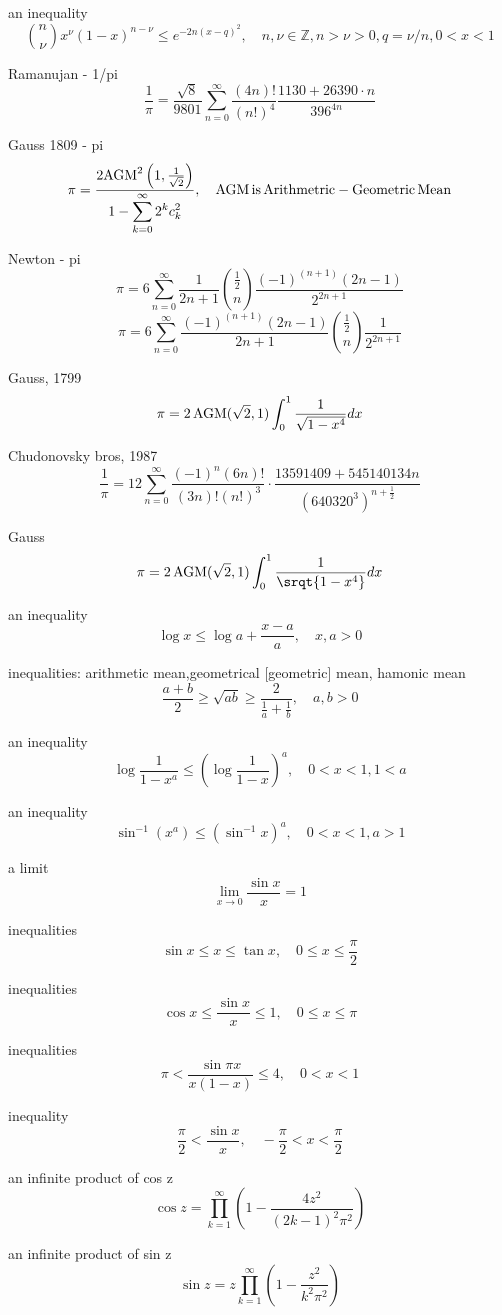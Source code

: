 an inequality
$$
\binom{n}{\nu}x^\nu(1-x)^{n-\nu} \le e^{-2n(x-q)^2}, \quad n,\nu\in\mathbb{Z},n>\nu>0,q=\nu/n,0<x<1
$$

Ramanujan - 1/pi
$$
\frac{1}{\pi}=\frac{\sqrt{8}}{9801}\sum^\infty_{n=0}\frac{(4n)!}{(n!)^4}\frac{1130+26390\cdot n}{396^{4n}}
$$

Gauss 1809 - pi
$$
\pi = \frac{2{\rm AGM}^2\left(1,\frac{1}{\sqrt{2}}\right)}{\displaystyle 1-\sum^\infty_{k=0}2^k c_k^2}, \quad {\rm AGM}\,{\rm is}\,{\rm Arithmetric-Geometric}\,{\rm Mean}
$$

Newton - pi
$$
\pi=6 \sum^\infty_{n=0}\frac{1}{2n+1}\binom{\frac{1}{2}}{n}\frac{(-1)^{(n+1)}(2n-1)}{2^{2n+1}}
$$
$$
\pi=6 \sum^\infty_{n=0}\frac{(-1)^{(n+1)}(2n-1)}{2n+1}\binom{\frac{1}{2}}{n}\frac{1}{2^{2n+1}}
$$

Gauss, 1799
$$
\pi=2\,{\rm AGM}(\sqrt{2},1)\int^1_0\frac{1}{\sqrt{1-x^4}}dx
$$

Chudonovsky bros, 1987
$$
\frac{1}{\pi}=12\sum^\infty_{n=0}\frac{(-1)^n(6n)!}{(3n)!(n!)^3}\cdot\frac{13591409+545140134n}{(640320^3)^{n+\frac{1}{2}}}
$$

Gauss
$$
\pi=2\,{\rm AGM}(\sqrt{2},1)\int^1_0\frac{1}{\srqt{1-x^4}}dx
$$

an inequality
$$
\log x \le \log a +\frac{x-a}{a}, \quad x,a>0
$$

inequalities: arithmetic mean,geometrical [geometric] mean, hamonic mean
$$
\frac{a+b}{2} \ge \sqrt{ab} \ge \frac{2}{\frac{1}{a}+\frac{1}{b}}, \quad a,b>0
$$

an inequality
$$
\log \frac{1}{1-x^a} \le \left(\log \frac{1}{1-x}\right)^a, \quad 0<x<1, 1<a
$$

an inequality
$$
\sin^{-1}(x^a) \le \left(\sin^{-1} x\right)^a, \quad 0<x<1,a>1
$$

a limit
$$
\lim_{x\rightarrow 0}\frac{\sin x}{x}=1
$$

inequalities
$$
\sin x \le x \le \tan x, \quad 0 \le x \le \frac{\pi}{2}
$$

inequalities
$$
\cos x \le \frac{\sin x}{x} \le 1, \quad 0 \le x \le \pi
$$

inequalities
$$
\pi < \frac{\sin \pi x}{x(1-x)} \le 4 , \quad 0<x<1
$$

inequality
$$
\frac{\pi}{2} < \frac{\sin x}{x} , \quad -\frac{\pi}{2}<x<\frac{\pi}{2}
$$

an infinite product of cos z
$$
\cos z = \prod^\infty_{k=1}\left(1-\frac{4z^2}{(2k-1)^2\pi^2}\right)
$$

an infinite product of sin z
$$
\sin z = z\prod^\infty_{k=1}\left(1-\frac{z^2}{k^2\pi^2}\right)
$$

